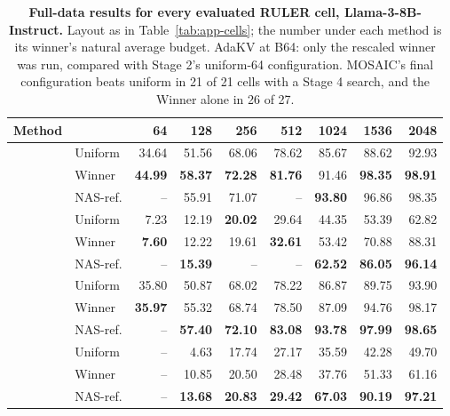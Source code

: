 \begin{table}[tp]
  \centering
  \footnotesize
  \setlength{\tabcolsep}{14pt}
  \renewcommand{\arraystretch}{1.0}
\begin{tabular}{@{} c l rrrrrrr @{}}
  \toprule
  \textbf{Method} & & \textbf{64} & \textbf{128} & \textbf{256} & \textbf{512} & \textbf{1024} & \textbf{1536} & \textbf{2048} \\
  \midrule
   & Uniform & 34.64 & 51.56 & 68.06 & 78.62 & 85.67 & 88.62 & 92.93 \\
   & Winner & \textbf{44.99} & \textbf{58.37} & \textbf{72.28} & \textbf{81.76} & 91.46 & \textbf{98.35} & \textbf{98.91} \\
   & NAS-ref. & -- & 55.91 & 71.07 & -- & \textbf{93.80} & 96.86 & 98.35 \\
  \midrule
   & Uniform & 7.23 & 12.19 & \textbf{20.02} & 29.64 & 44.35 & 53.39 & 62.82 \\
   & Winner & \textbf{7.60} & 12.22 & 19.61 & \textbf{32.61} & 53.42 & 70.88 & 88.31 \\
   & NAS-ref. & -- & \textbf{15.39} & -- & -- & \textbf{62.52} & \textbf{86.05} & \textbf{96.14} \\
  \midrule
   & Uniform & 35.80 & 50.87 & 68.02 & 78.22 & 86.87 & 89.75 & 93.90 \\
   & Winner & \textbf{35.97} & 55.32 & 68.74 & 78.50 & 87.09 & 94.76 & 98.17 \\
   & NAS-ref. & -- & \textbf{57.40} & \textbf{72.10} & \textbf{83.08} & \textbf{93.78} & \textbf{97.99} & \textbf{98.65} \\
  \midrule
   & Uniform & -- & 4.63 & 17.74 & 27.17 & 35.59 & 42.28 & 49.70 \\
   & Winner & -- & 10.85 & 20.50 & 28.48 & 37.76 & 51.33 & 61.16 \\
   & NAS-ref. & -- & \textbf{13.68} & \textbf{20.83} & \textbf{29.42} & \textbf{67.03} & \textbf{90.19} & \textbf{97.21} \\
  \bottomrule
\end{tabular}
  \caption{\textbf{Full-data results for every evaluated RULER cell, Llama-3-8B-Instruct.} Layout as in Table~\ref{tab:app-cells}; the number under each method is its winner's natural average budget. AdaKV at B64: only the rescaled winner was run, compared with Stage 2's uniform-64 configuration. MOSAIC's final configuration beats uniform in 21 of 21 cells with a Stage 4 search, and the Winner alone in 26 of 27.}
  \label{tab:app-cells-ruler}
\end{table}

